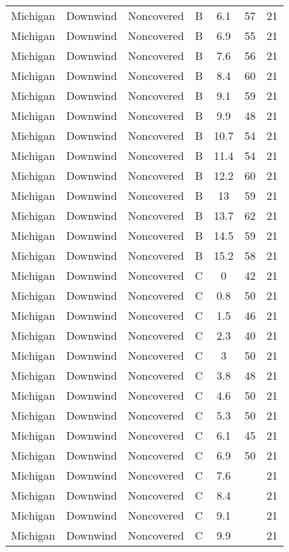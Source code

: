 \documentclass{article}
\begin{document}
\begin{longtable}[H]{ccccccc}
Michigan & Downwind & Noncovered & B & 6.1  & 57 & 21 \\
Michigan & Downwind & Noncovered & B & 6.9  & 55 & 21 \\
Michigan & Downwind & Noncovered & B & 7.6  & 56 & 21 \\
Michigan & Downwind & Noncovered & B & 8.4  & 60 & 21 \\
Michigan & Downwind & Noncovered & B & 9.1  & 59 & 21 \\
Michigan & Downwind & Noncovered & B & 9.9  & 48 & 21 \\
Michigan & Downwind & Noncovered & B & 10.7 & 54 & 21 \\
Michigan & Downwind & Noncovered & B & 11.4 & 54 & 21 \\
Michigan & Downwind & Noncovered & B & 12.2 & 60 & 21 \\
Michigan & Downwind & Noncovered & B & 13   & 59 & 21 \\
Michigan & Downwind & Noncovered & B & 13.7 & 62 & 21 \\
Michigan & Downwind & Noncovered & B & 14.5 & 59 & 21 \\
Michigan & Downwind & Noncovered & B & 15.2 & 58 & 21 \\
Michigan & Downwind & Noncovered & C & 0    & 42 & 21 \\
Michigan & Downwind & Noncovered & C & 0.8  & 50 & 21 \\
Michigan & Downwind & Noncovered & C & 1.5  & 46 & 21 \\
Michigan & Downwind & Noncovered & C & 2.3  & 40 & 21 \\
Michigan & Downwind & Noncovered & C & 3    & 50 & 21 \\
Michigan & Downwind & Noncovered & C & 3.8  & 48 & 21 \\
Michigan & Downwind & Noncovered & C & 4.6  & 50 & 21 \\
Michigan & Downwind & Noncovered & C & 5.3  & 50 & 21 \\
Michigan & Downwind & Noncovered & C & 6.1  & 45 & 21 \\
Michigan & Downwind & Noncovered & C & 6.9  & 50 & 21 \\
Michigan & Downwind & Noncovered & C & 7.6  &    & 21 \\
Michigan & Downwind & Noncovered & C & 8.4  &    & 21 \\
Michigan & Downwind & Noncovered & C & 9.1  &    & 21 \\
Michigan & Downwind & Noncovered & C & 9.9  &    & 21 \\

\end{longtable}
\end{document}
